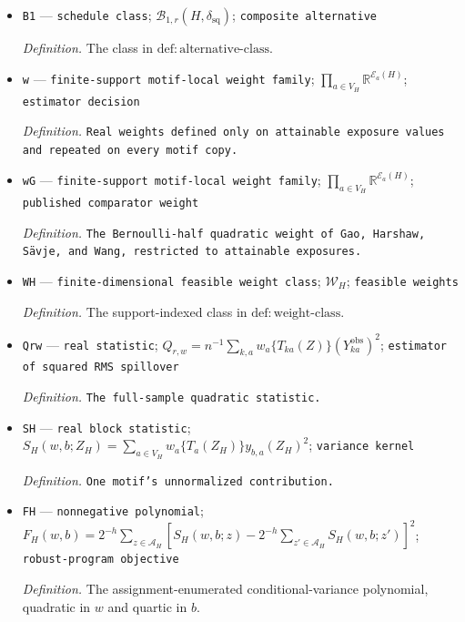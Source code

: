 \documentclass{article}
\begin{document}
\begin{itemize}
  \par\smallskip\noindent\emph{Definition.} The class in \(\mathrm{def:null\text{-}class}\).
  \item \texttt{B1} --- \texttt{schedule class}; \(\mathcal B_{1,r}(H,\delta_{\mathrm{sq}})\); \texttt{composite alternative}
  \par\smallskip\noindent\emph{Definition.} The class in \(\mathrm{def:alternative\text{-}class}\).
  \item \texttt{w} --- \texttt{finite-\allowbreak{}support motif-\allowbreak{}local weight family}; \(\prod_{a\in V_H}\mathbb R^{\mathcal E_a(H)}\); \texttt{estimator decision}
  \par\smallskip\noindent\emph{Definition.} \texttt{Real weights defined only on attainable exposure values and repeated on every motif copy.}
  \item \texttt{wG} --- \texttt{finite-\allowbreak{}support motif-\allowbreak{}local weight family}; \(\prod_{a\in V_H}\mathbb R^{\mathcal E_a(H)}\); \texttt{published comparator weight}
  \par\smallskip\noindent\emph{Definition.} \texttt{The Bernoulli-\allowbreak{}half quadratic weight of Gao,\allowbreak{} Harshaw,\allowbreak{} Sävje,\allowbreak{} and Wang,\allowbreak{} restricted to attainable exposures.}
  \item \texttt{WH} --- \texttt{finite-\allowbreak{}dimensional feasible weight class}; \(\mathcal W_H\); \texttt{feasible weights}
  \par\smallskip\noindent\emph{Definition.} The support-indexed class in \(\mathrm{def:weight\text{-}class}\).
  \item \texttt{Qrw} --- \texttt{real statistic}; \(Q_{r,w}=n^{-1}\sum_{k,a}w_a\{T_{ka}(Z)\}(Y^{\mathrm{obs}}_{ka})^2\); \texttt{estimator of squared RMS spillover}
  \par\smallskip\noindent\emph{Definition.} \texttt{The full-\allowbreak{}sample quadratic statistic.}
  \item \texttt{SH} --- \texttt{real block statistic}; \(S_H(w,b;Z_H)=\sum_{a\in V_H}w_a\{T_a(Z_H)\}y_{b,a}(Z_H)^2\); \texttt{variance kernel}
  \par\smallskip\noindent\emph{Definition.} \texttt{One motif's unnormalized contribution.}
  \item \texttt{FH} --- \texttt{nonnegative polynomial}; \(F_H(w,b)=2^{-h}\sum_{z\in\mathcal A_H}[S_H(w,b;z)-2^{-h}\sum_{z'\in\mathcal A_H}S_H(w,b;z')]^2\); \texttt{robust-\allowbreak{}program objective}
  \par\smallskip\noindent\emph{Definition.} The assignment-enumerated conditional-variance polynomial, quadratic in \(w\) and quartic in \(b\).

\end{itemize}
\end{document}
